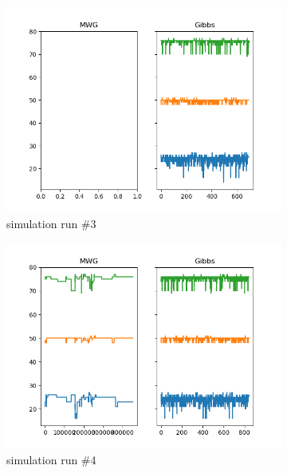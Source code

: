 \begin{figure}[H]
\begin{subfigure}{.3\textwidth}
    	\includegraphics[width=\linewidth]{../../plots/Trace_post_burnin_M4_N100_NMCMC3_seed2_diffind2.png}
    	\caption{simulation run \#3}
	\end{subfigure}
	\begin{subfigure}{.3\textwidth}
	    \centering
    	\includegraphics[width=\linewidth]{../../plots/Trace_post_burnin_M4_N100_NMCMC3_seed3_diffind2.png}
    	\caption{simulation run \#4}
	\end{subfigure}
	\begin{subfigure}{.3\textwidth}
	    \centering

\end{subfigure}
\end{figure}
